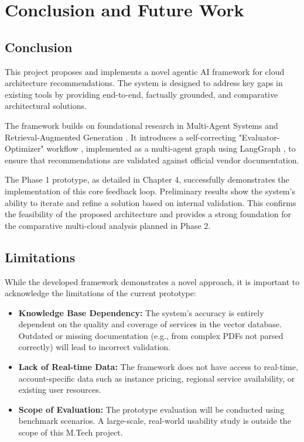 \chapter{Conclusion and Future Work}

\section{Conclusion}
This project proposes and implements a novel agentic AI framework for cloud architecture recommendations. The system is designed to address key gaps in existing tools by providing end-to-end, factually grounded, and comparative architectural solutions.

The framework builds on foundational research in Multi-Agent Systems \cite{sycara1998multiagent} and Retrieval-Augmented Generation \cite{lewis2020rag}. It introduces a self-correcting "Evaluator-Optimizer" workflow \cite{anthropic2024agents}, implemented as a multi-agent graph using LangGraph \cite{langgraph2024docs}, to ensure that recommendations are validated against official vendor documentation.

The Phase 1 prototype, as detailed in Chapter 4, successfully demonstrates the implementation of this core feedback loop. Preliminary results show the system's ability to iterate and refine a solution based on internal validation. This confirms the feasibility of the proposed architecture and provides a strong foundation for the comparative multi-cloud analysis planned in Phase 2.

\section{Limitations}
While the developed framework demonstrates a novel approach, it is important to acknowledge the limitations of the current prototype:
\begin{itemize}
    \item \textbf{Knowledge Base Dependency:} The system's accuracy is entirely dependent on the quality and coverage of services in the vector database. Outdated or missing documentation (e.g., from complex PDFs not parsed correctly) will lead to incorrect validation.
    \item \textbf{Lack of Real-time Data:} The framework does not have access to real-time, account-specific data such as instance pricing, regional service availability, or existing user resources.

    \item \textbf{Scope of Evaluation:} The prototype evaluation will be conducted using benchmark scenarios. A large-scale, real-world usability study is outside the scope of this M.Tech project.
\end{itemize}

